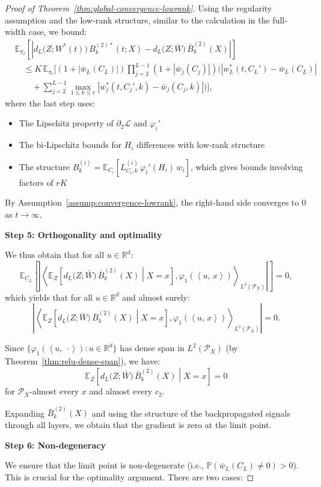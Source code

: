 \documentclass[11pt]{article}
\newcommand{\E}{\mathbb{E}}
\newcommand{\Pp}{\mathbb{P}}
\newcommand{\R}{\mathbb{R}}
\newcommand{\1}{\mathbbm{1}}
\newcommand{\ip}[2]{\left\langle #1,\,#2 \right\rangle}
\begin{document}
\begin{proof}[Proof of Theorem~\ref{thm:global-convergence-lowrank}]
Using the regularity assumption and the low-rank structure, similar to the calculation in the full-width case, we bound:
\begin{align*}
&\E_{\pi_t}\left[\left|d_L\big(Z;W^*(t)\big)\,B_k^{(2)*}(t;X)-d_L\big(Z;\bar{W}\big)\,\bar{B}_k^{(2)}(X)\right|\right]\\
&\quad \le K\,\E_{\pi_t}\Big[(1+|\bar{w}_L(C_L)|)\prod_{j=2}^{L-1}(1+|\bar{w}_j(C_j)|)\Big(|w_L^*(t,C_L')-\bar{w}_L(C_L)|\\
&\qquad + \sum_{j=2}^{L-1}\max_{1\le k\le r}|w_j^*(t,C_j',k)-\bar{w}_j(C_j,k)|\Big)\Big],
\end{align*}
where the last step uses:
\begin{itemize}
\item The Lipschitz property of $\partial_2\mathcal{L}$ and $\varphi_i'$
\item The bi-Lipschitz bounds for $H_i$ differences with low-rank structure
\item The structure $B_k^{(i)} = \E_{C_i}[L^{(i)}_{C_i,k}\,\varphi_i'(H_i)\,w_i]$, which gives bounds involving factors of $rK$
\end{itemize}

By Assumption~\ref{assump:convergence-lowrank}, the right-hand side converges to $0$ as $t\to\infty$.

\textbf{Step 5: Orthogonality and optimality}

We thus obtain that for all $u\in\R^d$:
\[
\E_{C_L}\left[\left|\left\langle \E_{Z}\!\left[d_L\big(Z;\bar{W}\big)\,\bar{B}_k^{(2)}(X)\middle|X=x\right],\varphi_1(\ip{u}{x})\right\rangle_{L^2(\mathcal{P}_X)}\right|\right] = 0,
\]
which yields that for all $u\in\R^d$ and almost surely:
\[
\left|\left\langle \E_{Z}\!\left[d_L\big(Z;\bar{W}\big)\,\bar{B}_k^{(2)}(X)\middle|X=x\right],\varphi_1(\ip{u}{x})\right\rangle_{L^2(\mathcal{P}_X)}\right| = 0.
\]

Since $\{\varphi_1(\ip{u}{\cdot}): u\in\R^d\}$ has dense span in $L^2(\mathcal{P}_X)$ (by Theorem~\ref{thm:relu-dense-span}), we have:
\[
\E_{Z}\!\left[d_L\big(Z;\bar{W}\big)\,\bar{B}_k^{(2)}(X)\middle|X=x\right] = 0
\]
for $\mathcal{P}_X$-almost every $x$ and almost every $c_2$.

Expanding $\bar{B}_k^{(2)}(X)$ and using the structure of the backpropagated signals through all layers, we obtain that the gradient is zero at the limit point.

\textbf{Step 6: Non-degeneracy}

We ensure that the limit point is non-degenerate (i.e., $\Pp(\bar{w}_L(C_L) \ne 0) > 0$). This is crucial for the optimality argument. There are two cases:


\end{proof}
\end{document}
